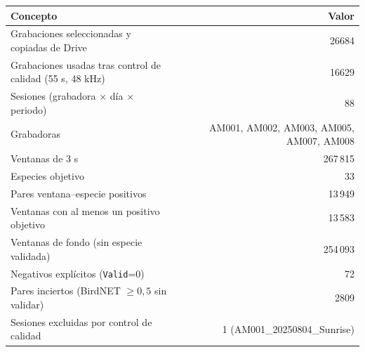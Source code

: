 \begin{tabular}{lr}
\toprule
Concepto & Valor\\
\midrule
Grabaciones seleccionadas y copiadas de Drive & 26684\\
Grabaciones usadas tras control de calidad (55 s, 48 kHz) & 16629\\
Sesiones (grabadora $\times$ día $\times$ periodo) & 88\\
Grabadoras & AM001, AM002, AM003, AM005, AM007, AM008\\
Ventanas de 3 s & 267\,815\\
Especies objetivo & 33\\
Pares ventana--especie positivos & 13\,949\\
Ventanas con al menos un positivo objetivo & 13\,583\\
Ventanas de fondo (sin especie validada) & 254\,093\\
Negativos explícitos (\texttt{Valid}=0) & 72\\
Pares inciertos (BirdNET $\geq 0{,}5$ sin validar) & 2809\\
Sesiones excluidas por control de calidad & 1 (AM001\_20250804\_Sunrise)\\
\bottomrule
\end{tabular}
